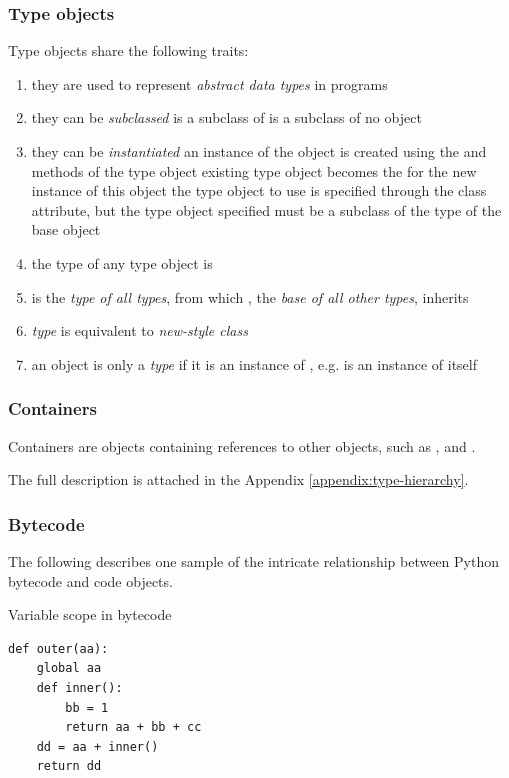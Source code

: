 \documentclass{icldt}
\numberwithin{equation}{section}       %
\begin{document}
{\subsubsection{Type objects}
Type objects share the following traits:
\begin{enumerate}
	\item they are used to represent \emph{abstract data types} in programs
	\item they can be \emph{subclassed}
		\subitem {} is a subclass of 
		\subitem {} is a subclass of no object
	\item they can be \emph{instantiated}
		\subitem an instance of the object is created using the  and  methods of the type object
		\subitem existing type object becomes the  for the new instance of this object
		\subitem the type object to use is specified through the  class attribute, but the type object specified must be a subclass of the type of the base object
	\item the type of any type object is 
	\item {} is the \emph{type of all types}, from which , the \emph{base of all other types}, inherits
	\item \emph{type} is equivalent to \emph{new-style class}
	\item an object is only a \emph{type} if it is an instance of , e.g.  is an instance of itself
\end{enumerate}

\subsubsection{Containers}
Containers are objects containing references to other objects, such as ,  and .

The full description is attached in the Appendix \ref{appendix:type-hierarchy}.

\subsubsection{Bytecode}
The following describes one sample of the intricate relationship between Python bytecode and code objects.

\begin{listing}[H]
	\caption{Variable scope in bytecode}
	\begin{verbatim}
def outer(aa):
	global aa
	def inner():
		bb = 1
		return aa + bb + cc
	dd = aa + inner()
	return dd
	\end{verbatim}
	\label{lst:py-model-function}
\end{listing}

}
\end{document}
